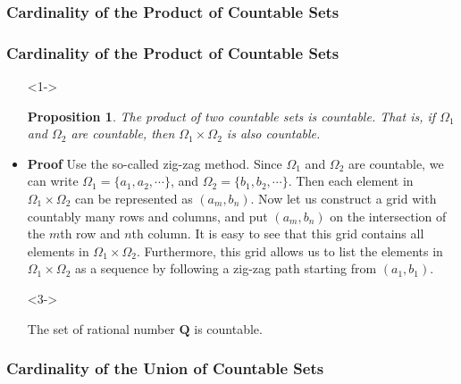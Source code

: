 \documentclass[handout]{beamer}
\newtheorem{Proposition}[theorem]{Proposition}
\begin{document}
\subsubsection{Cardinality of the Product of Countable Sets}

\frame
{
  \frametitle{Cardinality of the Product of Countable Sets}

  \begin{itemize}
  \item [] <1-> \begin{Proposition} The product of two countable sets is countable. That is, if $\Omega_1$ and $\Omega_2$ are countable, then $\Omega_1 \times \Omega_2$ is also countable. \end{Proposition} 

  \item<2-> \textbf{Proof} Use the so-called zig-zag method. Since $\Omega_1$ and $\Omega_2$ are countable, we can write $\Omega_1=\{a_1, a_2,\cdots \}$, and $\Omega_2=\{b_1, b_2,\cdots \}$. Then each element in $\Omega_1 \times \Omega_2$ can be represented as $(a_m, b_n)$.  Now let us construct a grid with countably many rows and columns, and put $(a_m, b_n)$ on the intersection of the $m$th row and $n$th column. It is easy to see that this grid contains all elements in $\Omega_1 \times \Omega_2$. Furthermore, this grid allows us to list the elements in $\Omega_1 \times \Omega_2$ as a sequence by following a zig-zag path starting from $(a_1,b_1)$. 
  
  

  \item[] <3->  \begin{Corollary} The set of rational number $\mathbf{Q}$ is countable.  \end{Corollary}
  
    
  \end{itemize}
}



\subsubsection{Cardinality of the Union of Countable Sets}
\end{document}
